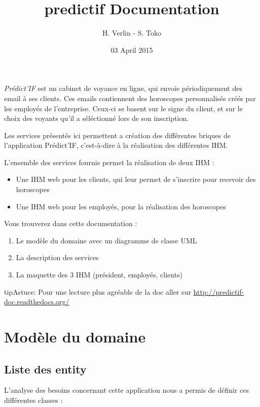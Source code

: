 \documentclass[a4paper,10pt,french]{sphinxmanual}
\title{predictif Documentation}
\date{03 April 2015}
\author{H. Verlin - S. Toko}
\begin{document}
\maketitle
\tableofcontents
{}\label{index::doc}


\emph{Prédict’IF} est un cabinet de voyance en ligne, qui envoie périodiquement des email à ses clients. Ces emails contiennent des horoscopes personnalisés créés par les employés de l'entreprise. Ceux-ci se basent sur le signe du client, et sur le choix des voyants qu'il a séléctionné lors de son inscription.

Les services présentés ici permettent a création des différentes briques de l'application Prédict’IF, c'est-à-dire à la réalisation des différentes IHM.

L'ensemble des services fournis permet la réalisation de deux IHM :
\begin{itemize}
\item {} 
Une IHM web pour les clients, qui leur permet de s'inscrire pour recevoir des horoscopes

\item {} 
Une IHM web pour les employés, pour la réalisation des horoscopes

\end{itemize}

Vous trouverez dans cette documentation :
\begin{enumerate}
\item {} 
Le modèle du domaine avec un diagramme de classe UML

\item {} 
La description des services

\item {} 
La maquette des 3 IHM (président, employés, clients)

\end{enumerate}

\begin{notice}{tip}{Astuce:}
Pour une lecture plus agréable de la doc aller sur \href{http://predictif-doc.readthedocs.org/}{http://predictif-doc.readthedocs.org/}
\end{notice}


\chapter{Modèle du domaine}
\label{modele:predictif-documentation}\label{modele:modele-du-domaine}\label{modele::doc}

\section{Liste des entity}
\label{modele:liste-des-entity}
L'analyse des besoins concernant cette application nous a permis de définir ces différentes classes :
\end{document}

